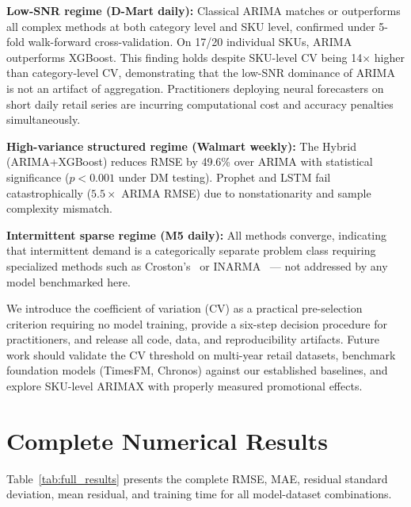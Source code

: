 \documentclass[journal]{IEEEtran}
\begin{document}
\textbf{Low-SNR regime (D-Mart daily):} Classical ARIMA matches or outperforms all complex methods at both category level and SKU level, confirmed under 5-fold walk-forward cross-validation. On 17/20 individual SKUs, ARIMA outperforms XGBoost. This finding holds despite SKU-level CV being 14$\times$ higher than category-level CV, demonstrating that the low-SNR dominance of ARIMA is not an artifact of aggregation. Practitioners deploying neural forecasters on short daily retail series are incurring computational cost and accuracy penalties simultaneously.

\textbf{High-variance structured regime (Walmart weekly):} The Hybrid (ARIMA+XGBoost) reduces RMSE by 49.6\% over ARIMA with statistical significance ($p{<}0.001$ under DM testing). Prophet and LSTM fail catastrophically ($5.5\times$ ARIMA RMSE) due to nonstationarity and sample complexity mismatch.

\textbf{Intermittent sparse regime (M5 daily):} All methods converge, indicating that intermittent demand is a categorically separate problem class requiring specialized methods such as Croston's~\cite{croston1972forecasting} or INARMA~\cite{mckenzie1985some} — not addressed by any model benchmarked here.

We introduce the coefficient of variation (CV) as a practical pre-selection criterion requiring no model training, provide a six-step decision procedure for practitioners, and release all code, data, and reproducibility artifacts. Future work should validate the CV threshold on multi-year retail datasets, benchmark foundation models (TimesFM, Chronos) against our established baselines, and explore SKU-level ARIMAX with properly measured promotional effects.

\appendix
\section{Complete Numerical Results}
\label{app:results}

Table~\ref{tab:full_results} presents the complete RMSE, MAE, residual standard deviation, mean residual, and training time for all model-dataset combinations.
\end{document}
